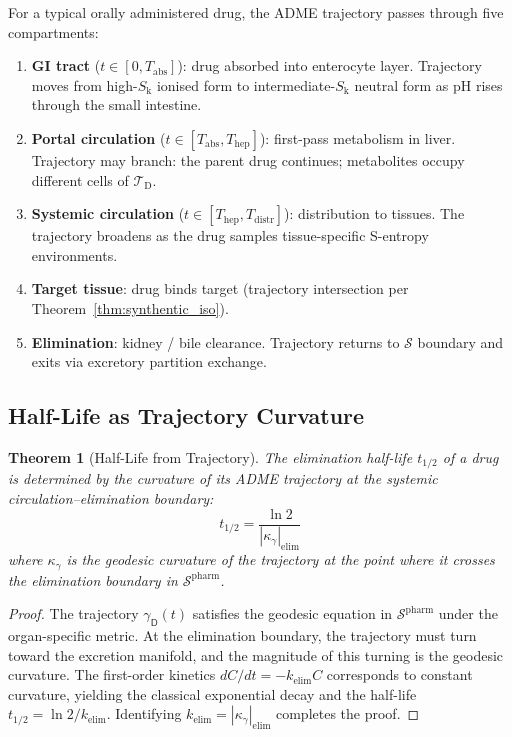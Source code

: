 \documentclass[11pt,twocolumn,a4paper]{article}
\newtheorem{theorem}{Theorem}[section]
\theoremstyle{definition}
\theoremstyle{remark}
\newcommand{\Sk}{S_{\mathrm{k}}}
\newcommand{\Sspace}{\mathcal{S}}
\newcommand{\Trie}{\mathcal{T}}
\newcommand{\Dtrie}{\Trie_{\mathrm{D}}}
\newcommand{\Drug}{\mathsf{D}}
\begin{document}
For a typical orally administered drug, the ADME trajectory passes through five compartments:
\begin{enumerate}[nosep,leftmargin=*]
\item \textbf{GI tract} ($t \in [0, T_{\mathrm{abs}}]$): drug absorbed into enterocyte layer. Trajectory moves from high-$\Sk$ ionised form to intermediate-$\Sk$ neutral form as pH rises through the small intestine.
\item \textbf{Portal circulation} ($t \in [T_{\mathrm{abs}}, T_{\mathrm{hep}}]$): first-pass metabolism in liver. Trajectory may branch: the parent drug continues; metabolites occupy different cells of $\Dtrie$.
\item \textbf{Systemic circulation} ($t \in [T_{\mathrm{hep}}, T_{\mathrm{distr}}]$): distribution to tissues. The trajectory broadens as the drug samples tissue-specific S-entropy environments.
\item \textbf{Target tissue}: drug binds target (trajectory intersection per Theorem~\ref{thm:synthentic_iso}).
\item \textbf{Elimination}: kidney / bile clearance. Trajectory returns to $\Sspace$ boundary and exits via excretory partition exchange.
\end{enumerate}

\subsection{Half-Life as Trajectory Curvature}

\begin{theorem}[Half-Life from Trajectory]
\label{thm:halflife}
The elimination half-life $t_{1/2}$ of a drug is determined by the curvature of its ADME trajectory at the systemic circulation--elimination boundary:
\begin{equation}
t_{1/2} = \frac{\ln 2}{|\kappa_\gamma|_{\mathrm{elim}}}
\end{equation}
where $\kappa_\gamma$ is the geodesic curvature of the trajectory at the point where it crosses the elimination boundary in $\Sspace^{\mathrm{pharm}}$.
\end{theorem}

\begin{proof}
The trajectory $\gamma_\Drug(t)$ satisfies the geodesic equation in $\Sspace^{\mathrm{pharm}}$ under the organ-specific metric. At the elimination boundary, the trajectory must turn toward the excretion manifold, and the magnitude of this turning is the geodesic curvature. The first-order kinetics $dC/dt = -k_{\mathrm{elim}} C$ corresponds to constant curvature, yielding the classical exponential decay and the half-life $t_{1/2} = \ln 2 / k_{\mathrm{elim}}$. Identifying $k_{\mathrm{elim}} = |\kappa_\gamma|_{\mathrm{elim}}$ completes the proof.
\end{proof}
\end{document}
